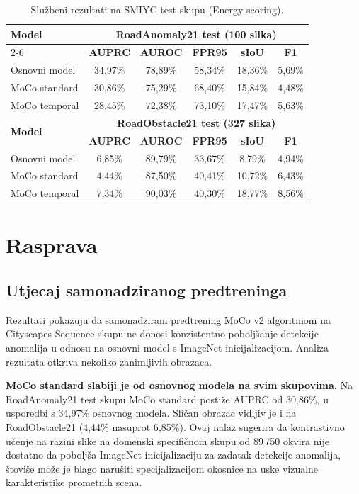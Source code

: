 \documentclass[diplomskirad]{fer}
\begin{document}
\begin{table}[H]
	\centering
	\caption{Službeni rezultati na SMIYC test skupu (Energy
		scoring).}
	\label{tab:test_results}
	\begin{tabular}{|l|c|c|c|c|c|}
		\hline
		\multirow{2}{*}{\textbf{Model}} &
		\multicolumn{5}{c|}{\textbf{RoadAnomaly21 test
				(100 slika)}} \\
		\cline{2-6}
		& \textbf{AUPRC} & \textbf{AUROC} & \textbf{FPR95} &
		\textbf{sIoU} & \textbf{F1} \\
		\hline
		Osnovni model & 34{,}97\% & 78{,}89\% & 58{,}34\% &
		18{,}36\% & 5{,}69\% \\
		MoCo standard & 30{,}86\% & 75{,}29\% & 68{,}40\% &
		15{,}84\% & 4{,}48\% \\
		MoCo temporal & 28{,}45\% & 72{,}38\% & 73{,}10\% &
		17{,}47\% & 5{,}63\% \\
		\hline
		\multirow{2}{*}{\textbf{Model}} &
		\multicolumn{5}{c|}{\textbf{RoadObstacle21 test
				(327 slika)}} \\
		\cline{2-6}
		& \textbf{AUPRC} & \textbf{AUROC} & \textbf{FPR95} &
		\textbf{sIoU} & \textbf{F1} \\
		\hline
		Osnovni model &  6{,}85\% & 89{,}79\% & 33{,}67\% &
		8{,}79\% & 4{,}94\% \\
		MoCo standard &  4{,}44\% & 87{,}50\% & 40{,}41\% &
		10{,}72\% & 6{,}43\% \\
		MoCo temporal &  7{,}34\% & 90{,}03\% & 40{,}30\% &
		18{,}77\% & 8{,}56\% \\
		\hline
	\end{tabular}
\end{table}


\section{Rasprava}
\label{sec:rasprava}

\subsection{Utjecaj samonadziranog predtreninga}

Rezultati pokazuju da samonadzirani predtrening MoCo v2 algoritmom
na Cityscapes-Sequence skupu ne donosi konzistentno poboljšanje
detekcije anomalija u odnosu na osnovni model s ImageNet
inicijalizacijom. Analiza rezultata otkriva nekoliko zanimljivih
obrazaca.

\textbf{MoCo standard slabiji je od osnovnog modela na svim
	skupovima.} Na RoadAnomaly21 test skupu MoCo standard postiže
AUPRC od 30{,}86\%, u usporedbi s 34{,}97\% osnovnog modela.
Sličan obrazac vidljiv je i na RoadObstacle21 (4{,}44\% nasuprot
6{,}85\%). Ovaj nalaz sugerira da kontrastivno učenje na razini
slike na domenski specifičnom skupu od 89\,750 okvira nije
dostatno da poboljša ImageNet inicijalizaciju za zadatak detekcije
anomalija, štoviše može je blago narušiti specijalizacijom
okosnice na uske vizualne karakteristike prometnih scena.
\end{document}
